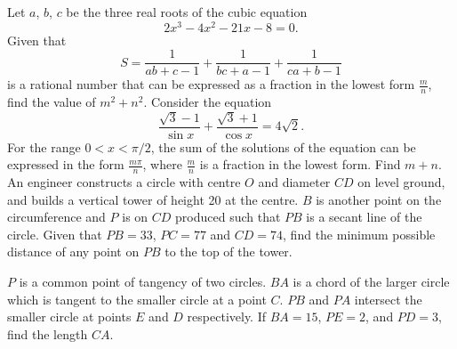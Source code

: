 \begin{enumerate}
    \begin{center}
    \end{center}
    \hyperrefitem[Q::2024-S-1-14] Let $a$, $b$, $c$ be the three real roots of the cubic equation \[2x^3 - 4x^2 - 21x - 8 = 0.\] Given that \[S = \frac1{ab + c -1} + \frac1{bc + a -1} + \frac1{ca + b - 1}\] is a rational number that can be expressed as a fraction in the lowest form $\frac{m}{n}$, find the value of $m^2 + n^2$.
    \hyperrefitem[Q::2024-S-1-15] Consider the equation \[\frac{\sqrt3 - 1}{\sin x} + \frac{\sqrt3 + 1}{\cos x} = 4\sqrt2.\] For the range $0 < x < \pi/2$, the sum of the solutions of the equation can be expressed in the form $\frac{m\pi}{n}$, where $\frac{m}{n}$ is a fraction in the lowest form. Find $m + n$.
    \hyperrefitem[Q::2024-S-1-16] An engineer constructs a circle with centre $O$ and diameter $CD$ on level ground, and builds a vertical tower of height 20 at the centre. $B$ is another point on the circumference and $P$ is on $CD$ produced such that $PB$ is a secant line of the circle. Given that $PB = 33$, $PC = 77$ and $CD = 74$, find the minimum possible distance of any point on $PB$ to the top of the tower.

    \begin{center}
    \end{center}
    \hyperrefitem[Q::2024-S-1-17] $P$ is a common point of tangency of two circles. $BA$ is a chord of the larger circle which is tangent to the smaller circle at a point $C$. $PB$ and $PA$ intersect the smaller circle at points $E$ and $D$ respectively. If $BA = 15$, $PE = 2$, and $PD = 3$, find the length $CA$.


\end{enumerate}
